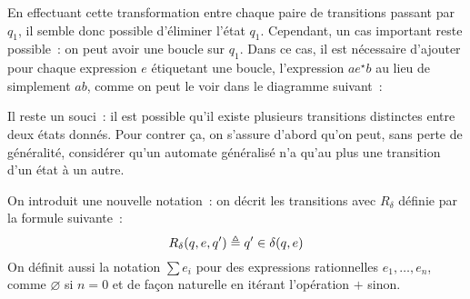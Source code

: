 \begin{figure}[H]
  \centering
\end{figure}

En effectuant cette transformation entre chaque paire de transitions passant par
$q_1$, il semble donc possible d'éliminer l'état $q_1$. Cependant, un cas
important reste possible~: on peut avoir une boucle sur $q_1$. Dans ce cas, il
est nécessaire d'ajouter pour chaque expression $e$ étiquetant une boucle,
l'expression $ae^\star b$ au lieu de simplement $ab$, comme on peut le voir dans
le diagramme suivant~:

\begin{figure}[H]
  \centering
\end{figure}

Il reste un souci~: il est possible qu'il existe plusieurs transitions
distinctes entre deux états donnés. Pour contrer ça, on s'assure d'abord qu'on
peut, sans perte de généralité, considérer qu'un automate généralisé n'a qu'au
plus une transition d'un état à un autre.

On introduit une nouvelle notation~: on décrit les transitions avec $R_\delta$
définie par la formule suivante~:
\[R_\delta(q,e,q') \triangleq q' \in \delta(q,e)\]
On définit aussi la notation $\sum e_i$ pour des expressions rationnelles
$e_1,\ldots,e_n$, comme $\varnothing$ si $n = 0$ et de façon naturelle en
itérant l'opération $+$ sinon.


